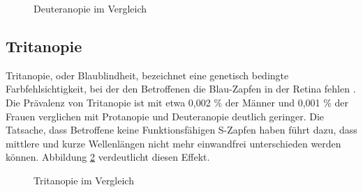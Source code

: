 \documentclass[a4paper]{article}
\begin{document}
\begin{figure}[H]
\centering
{}
\caption{Deuteranopie im Vergleich}
\label{deuteranope}
\end{figure}

\newpage

\subsection*{Tritanopie}
Tritanopie, oder Blaublindheit, bezeichnet eine genetisch bedingte Farbfehlsichtigkeit, bei der den Betroffenen die Blau-Zapfen in der Retina fehlen \cite{WP-T}. Die Prävalenz von Tritanopie ist mit etwa 0,002 \% der Männer und 0,001 \% der Frauen verglichen mit Protanopie und Deuteranopie deutlich geringer. Die Tatsache, dass Betroffene keine Funktionsfähigen S-Zapfen haben führt dazu, dass mittlere und kurze Wellenlängen nicht mehr einwandfrei unterschieden werden können. Abbildung \ref{tritanope} verdeutlicht diesen Effekt.

\begin{figure}[H]
\centering
{}
\caption{Tritanopie im Vergleich}
\label{tritanope}
\end{figure}
\end{document}

